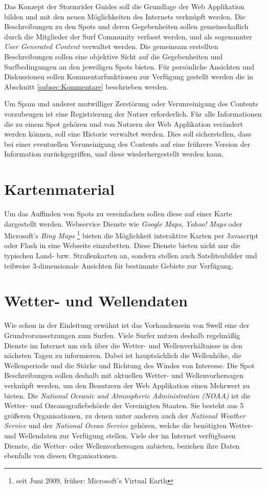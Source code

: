 Das Konzept der Stormrider Guides soll die Grundlage der Web
Applikation bilden und mit den neuen Möglichkeiten des Internets
verknüpft werden. Die Beschreibungen zu den Spots und deren
Gegebenheiten sollen gemeinschaflich durch die Mitglieder der Surf
Community verfasst werden, und als sogenannter \textit{User Generated
  Content} verwaltet werden. Die gemeinsam erstellten Beschreibungen
sollen eine objektive Sicht auf die Gegebenheiten und Surfbedingungen
an den jeweiligen Spots bieten. Für persönliche Ansichten und
Diskussionen sollen Kommentarfunktionen zur Verfügung gestellt werden
die in Abschnitt \ref{subsec:Kommentare} beschrieben werden.

Um Spam und anderer mutwilliger Zerstörung oder Verunreinigung des
Contents vorzubeugen ist eine Registrierung der Nutzer
erforderlich. Für alle Informationen die zu einem Spot gehören und von
Nutzern der Web Applikation verändert werden können, soll eine
Historie verwaltet werden. Dies soll sicherstellen, dass bei einer
eventuellen Veruneinigung des Contents auf eine frührere Version der
Information zurückgegriffen, und diese wiederhergestellt werden kann.

\section{Kartenmaterial}

Um das Auffinden von Spots zu vereinfachen sollen diese auf einer
Karte dargestellt werden. Webservice Dienste wie \textit{Google Maps},
\textit{Yahoo! Maps} oder Microsoft's \textit{Bing Maps}
\footnote{seit Juni 2009, früher: Microsoft's Virtual Earth} bieten
die Möglichkeit interaktive Karten per Java\-script oder Flash in eine
Webseite einzubetten. Diese Dienste bieten nicht nur die typischen
Land- bzw. Straßenkarten an, sondern stellen auch Satelitenbilder und
teilweise 3-dimensionale Ansichten für bestimmte Gebiete zur
Verfügung.

\section{Wetter- und Wellendaten}
\label{sec:Wetter- und Wellendaten}

Wie schon in der Einleitung erwähnt ist das Vorhandensein von Swell
eine der Grundvoraussetzungen zum Surfen. Viele Surfer nutzen deshalb
regelmäßig Dienste im Internet um sich über die Wetter- und
Wellenverhältnisse in den nächsten Tagen zu informieren. Dabei ist
hauptsächlich die Wellenhöhe, die Wellenperiode und die Stärke und
Richtung des Windes von Interesse. Die Spot Beschreibungen sollen
deshalb mit aktuellen Wetter- und Wellenvorhersagen verknüpft werden,
um den Benutzern der Web Applikation einen Mehrwert zu bieten. Die
\textit{National Oceanic and Atmospheric Administration (NOAA)} ist
die Wetter- und Ozeanografiebehörde der Vereinigten Staaten. Sie
besteht aus 5 größeren Organisationen, zu denen unter anderen auch der
\textit{National Weather Service} und der \textit{National Ocean
  Service} gehören, welche die benötigten Wetter- und Wellendaten zur
Verfügung stellen. Viele der im Internet verfügbaren Dienste, die
Wetter- oder Wellenvorhersagen anbieten, beziehen ihre Daten ebenfalls
von diesen Organisationen.

